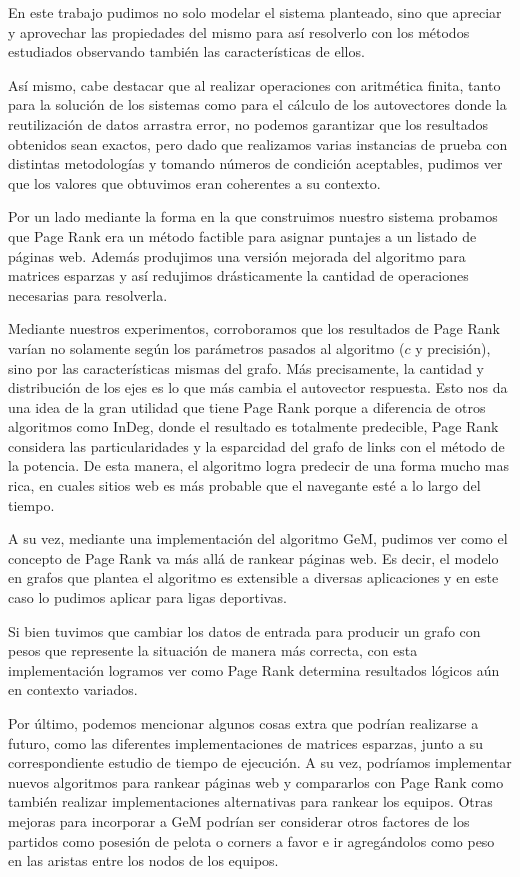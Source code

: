 \setlength{\parindent}{15.0pt} %
En este trabajo pudimos no solo modelar el sistema planteado, sino que
apreciar y aprovechar las propiedades del mismo para así resolverlo con los
métodos estudiados observando también las características de ellos.

Así mismo, cabe destacar que al realizar operaciones con aritmética finita,
tanto para la solución de los sistemas como para el cálculo de los autovectores donde
 la reutilización de datos arrastra error, no podemos
garantizar que los resultados obtenidos sean exactos, pero dado que
realizamos varias instancias de prueba con distintas
metodologías y tomando números de condición aceptables, pudimos ver que los
valores que obtuvimos eran coherentes a su contexto.

Por un lado mediante la forma en la que construimos nuestro sistema probamos
que Page Rank era un método factible para asignar puntajes a un listado de páginas web. Además produjimos
una versión mejorada del algoritmo para matrices esparzas y así redujimos drásticamente la
cantidad de operaciones necesarias para resolverla.

Mediante nuestros experimentos, corroboramos que los resultados de Page Rank varían no solamente según los parámetros
pasados al algoritmo ($c$ y precisión), sino por las características mismas del grafo. Más precisamente, la cantidad y distribución de
los ejes es lo que más cambia el autovector respuesta. Esto nos da una idea de la gran utilidad que tiene Page Rank porque a diferencia de otros algoritmos
como InDeg, donde el resultado es totalmente predecible, Page Rank considera las particularidades y la esparcidad del grafo de links con el método de la potencia. De esta manera, el algoritmo logra predecir de una forma mucho mas rica, en cuales sitios web es más probable que el navegante esté a lo largo del tiempo.

A su vez, mediante una implementación del algoritmo GeM, pudimos ver como el concepto de Page Rank va
más allá de rankear páginas web. Es decir, el modelo en grafos que plantea el algoritmo es extensible
a diversas aplicaciones y en este caso lo pudimos aplicar para ligas deportivas.

Si bien tuvimos que cambiar los datos de entrada para producir un grafo con pesos que represente la situación de manera más correcta, con esta implementación logramos ver como Page Rank determina resultados lógicos aún en contexto variados.

Por último, podemos mencionar algunos cosas extra que podrían realizarse a
futuro, como las diferentes implementaciones de matrices esparzas, 
junto a su correspondiente estudio de tiempo de ejecución. A su vez, podríamos implementar 
nuevos algoritmos para rankear páginas web y compararlos con Page Rank como también realizar implementaciones alternativas para rankear los equipos.
Otras mejoras para incorporar a GeM podrían ser considerar otros factores de los partidos como posesión de pelota o corners a favor e ir agregándolos como peso en las aristas entre los nodos de los equipos.

